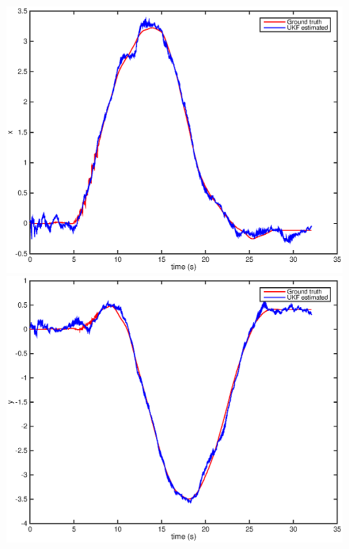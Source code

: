 \documentclass[letter, 10pt]{article}
\begin{document}
\begin{onehalfspacing}
\begin{figure}[h]
	\centering
	\begin{minipage}{.25\textwidth} 
  		\centering
    		\includegraphics[width=1\linewidth]{i_x.eps}
	\end{minipage}%
	\begin{minipage}{.25\textwidth} 
		\centering
    		\includegraphics[width=1\linewidth]{i_y.eps}
	\end{minipage}%
	\begin{minipage}{.25\textwidth}  		
		\centering

\end{minipage}
\end{figure}
\end{onehalfspacing}
\end{document}
